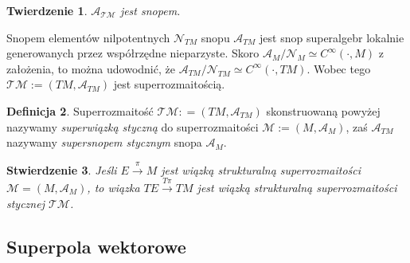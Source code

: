 \documentclass[11pt,a4paper]{report}
\newtheorem{theorem}{Twierdzenie}[section]
\newtheorem{proposition}[theorem]{Stwierdzenie}
\theoremstyle{definition}
\newtheorem{definition}[theorem]{Definicja}
\begin{document}
\begin{theorem}
\label{thm:supertangent_sheaf01}
 $\mathcal{A}_{\mathcal{TM}}$ jest snopem.
\end{theorem}

Snopem elementów nilpotentnych $\mathcal{N}_{TM}$ snopu $\mathcal{A}_{TM}$ jest snop superalgebr lokalnie generowanych przez współrzędne nieparzyste. Skoro $\mathcal{A}_{M}/\mathcal{N}_M\simeq C^\infty(\cdot,M)$ z założenia, to można udowodnić, że $\mathcal{A}_{TM} / \mathcal{N}_{TM} \simeq C^\infty(\cdot,{TM})$. Wobec tego $\mathcal{T} \mathcal{M} := (TM, \mathcal{A}_{TM})$ jest superrozmaitością.

\begin{definition}
 Superrozmaitość $\mathcal{T} \mathcal{M}: = (TM, \mathcal{A}_{TM})$ skonstruowaną powyżej nazywamy \textit{superwiązką styczną} do superrozmaitości $\mathcal{M} := (M, \mathcal{A}_M)$, zaś $\mathcal{A}_{TM}$ nazywamy \textit{supersnopem stycznym} snopa $\mathcal{A}_{M}$.
\end{definition}

\begin{proposition}
 Jeśli $E \stackrel{\pi}{\rightarrow} M$ jest wiązką strukturalną superrozmaitości $\mathcal{M} = (M, \mathcal{A}_M)$, to wiązka $TE \stackrel{T\pi}{\longrightarrow} TM$ jest wiązką strukturalną superrozmaitości stycznej $\mathcal{T} \mathcal{M}$.
\end{proposition}

\subsection{Superpola wektorowe}
\end{document}
